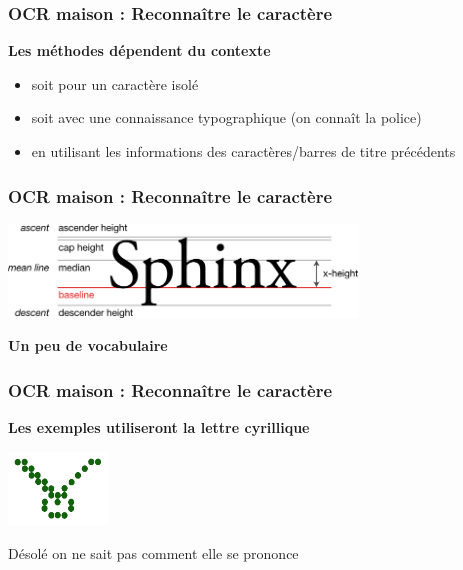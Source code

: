 \documentclass[xcolor=dvipsnames]{beamer}
\begin{document}
\begin{frame}
\frametitle{OCR maison : Reconnaître le caractère }
      \begin{alertblock}{}
            \begin{center}
                  \textbf{\Large Les méthodes dépendent du contexte}\pause
            \end{center}
            \begin{itemize}
            \item soit pour un caractère isolé\pause
            \item soit avec une connaissance typographique \pause (on connaît la police)\pause
            \item en utilisant les informations des caractères/barres de titre précédents
            \end{itemize}
      \end{alertblock}
\end{frame}


\begin{frame}
\frametitle{OCR maison : Reconnaître le caractère }
        \includegraphics[width=350px]{Typography_Line_Terms.png}
      \begin{alertblock}{}
            \begin{center}
                  \textbf{\Large Un peu de vocabulaire}
            \end{center}
      \end{alertblock}
\end{frame}

\begin{frame}
\frametitle{OCR maison : Reconnaître le caractère }
      \begin{alertblock}{}
    \begin{center}
              \textbf{\Large Les exemples utiliseront la lettre cyrillique}
    \end{center}
      \end{alertblock}
    \begin{center}
       \pause
       \includegraphics[width=100px]{chmoll.png}
    \end{center}
      \pause Désolé on ne sait pas comment elle se prononce
\end{frame}
\end{document}
